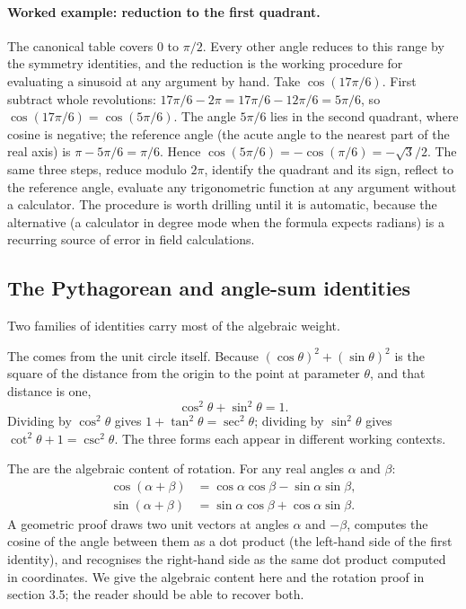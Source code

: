 \paragraph{Worked example: reduction to the first quadrant.} The
canonical table covers $0$ to $\pi/2$. Every other angle reduces to
this range by the symmetry identities, and the reduction is the
working procedure for evaluating a sinusoid at any argument by hand.
Take $\cos(17\pi/6)$. First subtract whole revolutions: $17\pi/6 -
2\pi = 17\pi/6 - 12\pi/6 = 5\pi/6$, so $\cos(17\pi/6) = \cos(5\pi/6)$.
The angle $5\pi/6$ lies in the second quadrant, where cosine is
negative; the reference angle (the acute angle to the nearest part
of the real axis) is $\pi - 5\pi/6 = \pi/6$. Hence $\cos(5\pi/6) =
-\cos(\pi/6) = -\sqrt{3}/2$. The same three steps, reduce modulo
$2\pi$, identify the quadrant and its sign, reflect to the reference
angle, evaluate any trigonometric function at any argument without a
calculator. The procedure is worth drilling until it is automatic,
because the alternative (a calculator in degree mode when the
formula expects radians) is a recurring source of error in field
calculations.

\subsection{The Pythagorean and angle-sum identities}

Two families of identities carry most of the algebraic weight.

The  comes from the unit circle
itself. Because $(\cos\theta)^{2} + (\sin\theta)^{2}$ is the square
of the distance from the origin to the point at parameter $\theta$,
and that distance is one,
\[
\cos^{2}\theta + \sin^{2}\theta = 1.
\]
Dividing by $\cos^{2}\theta$ gives $1 + \tan^{2}\theta =
\sec^{2}\theta$; dividing by $\sin^{2}\theta$ gives
$\cot^{2}\theta + 1 = \csc^{2}\theta$. The three forms each appear
in different working contexts.

The  are the algebraic content of
rotation. For any real angles $\alpha$ and $\beta$:
\begin{align*}
\cos(\alpha + \beta) &= \cos\alpha\cos\beta - \sin\alpha\sin\beta, \\
\sin(\alpha + \beta) &= \sin\alpha\cos\beta + \cos\alpha\sin\beta.
\end{align*}
A geometric proof draws two unit vectors at angles $\alpha$ and
$-\beta$, computes the cosine of the angle between them as a dot
product (the left-hand side of the first identity), and recognises
the right-hand side as the same dot product computed in
coordinates. We give the algebraic content here and the rotation
proof in section 3.5; the reader should be able to recover both.

